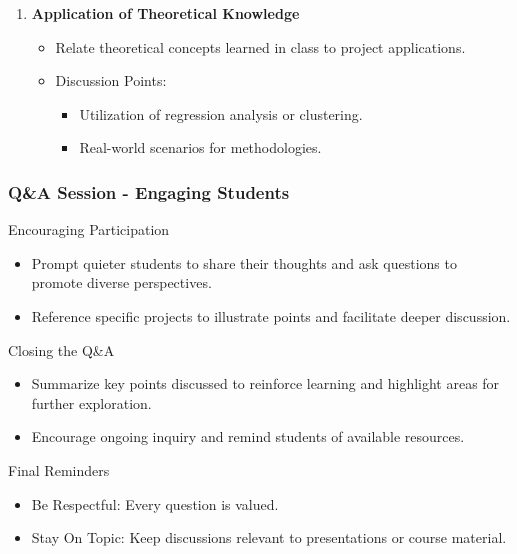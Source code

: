 \documentclass[aspectratio=169]{beamer}
\begin{document}
\begin{frame}[fragile]
\begin{enumerate}
        \item \textbf{Application of Theoretical Knowledge}
            \begin{itemize}
                \item Relate theoretical concepts learned in class to project applications.
                \item Discussion Points:
                    \begin{itemize}
                        \item Utilization of regression analysis or clustering.
                        \item Real-world scenarios for methodologies.
                    \end{itemize}
            \end{itemize}
    \end{enumerate}
\end{frame}

\begin{frame}[fragile]
    \frametitle{Q\&A Session - Engaging Students}
    \begin{block}{Encouraging Participation}
        \begin{itemize}
            \item Prompt quieter students to share their thoughts and ask questions to promote diverse perspectives.
            \item Reference specific projects to illustrate points and facilitate deeper discussion.
        \end{itemize}
    \end{block}
    
    \begin{block}{Closing the Q\&A}
        \begin{itemize}
            \item Summarize key points discussed to reinforce learning and highlight areas for further exploration.
            \item Encourage ongoing inquiry and remind students of available resources.
        \end{itemize}
    \end{block}
    
    \begin{block}{Final Reminders}
        \begin{itemize}
            \item Be Respectful: Every question is valued.
            \item Stay On Topic: Keep discussions relevant to presentations or course material.
        \end{itemize}
    \end{block}
\end{frame}
\end{document}
